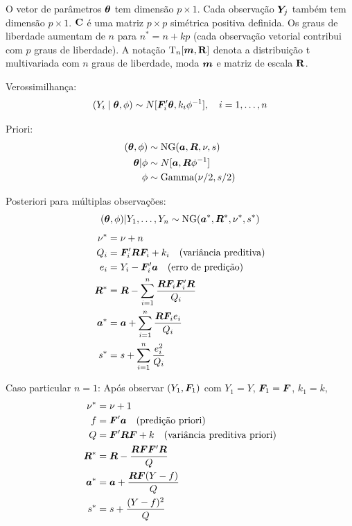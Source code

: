 \begin{theorem}
	\begin{note}
		\leavevmode
		\begin{outline}
			\1 O vetor de parâmetros $\bm{\theta}$ tem dimensão $p \times 1$.
			\1 Cada observação $\bm{Y}_j$ também tem dimensão $p \times 1$.
			\1 $\mathbf{C}$ é uma matriz $p \times p$ simétrica positiva definida.
			\1 Os graus de liberdade aumentam de $n$ para $n^* = n + kp$ (cada observação vetorial contribui com $p$ graus de liberdade).
			\1 A notação $\text{T}_n[\bm{m}, \mathbf{R}]$ denota a distribuição t multivariada com $n$ graus de liberdade, moda $\bm{m}$ e matriz de escala $\mathbf{R}$.
		\end{outline}
	\end{note}
\end{theorem}

\begin{theorem}
	\leavevmode 
	\begin{outline}
		\1 Verossimilhança: 
		\[ (Y_i \mid \bm{\theta}, \phi) \sim N[\bm{F}_i'\bm{\theta}, k_i\phi^{-1}], \quad i = 1, \ldots, n\]
		
		\1 Priori:
		\begin{align}
			(\bm{\theta},\phi) &\sim \text{NG}(\bm{a}, \bm{R}, \nu, s) \\
			\bm{\theta}|\phi &\sim N[\bm{a}, \bm{R}\phi^{-1}] \\
			\phi &\sim \text{Gamma}(\nu/2, s/2)
		\end{align}
		
		\1 Posteriori para múltiplas observações: 
		\[ (\bm{\theta},\phi)|Y_1, \ldots, Y_n \sim \text{NG}(\bm{a}^*, \bm{R}^*, \nu^*, s^*)\]
		\begin{align}
			\nu^* &= \nu + n \\
			Q_i &= \bm{F}_i'\bm{R}\bm{F}_i + k_i \quad \text{(variância preditiva)} \\
			e_i &= Y_i - \bm{F}_i'\bm{a} \quad \text{(erro de predição)} \\
			\bm{R}^* &= \bm{R} - \sum_{i=1}^n \frac{\bm{R}\bm{F}_i\bm{F}_i'\bm{R}}{Q_i} \\
			\bm{a}^* &= \bm{a} + \sum_{i=1}^n \frac{\bm{R}\bm{F}_i e_i}{Q_i} \\
			s^* &= s + \sum_{i=1}^n \frac{e_i^2}{Q_i}
		\end{align}	
		
		\2 Caso particular $n=1$: Após observar $(Y_1, \bm{F}_1)$ com $Y_1 = Y$, $\bm{F}_1 = \bm{F}$, $k_1 = k$,
		\begin{align}
			\nu^* &= \nu + 1 \\
			f &= \bm{F}'\bm{a} \quad \text{(predição priori)} \\
			Q &= \bm{F}'\bm{R}\bm{F} + k \quad \text{(variância preditiva priori)} \\
			\bm{R}^* &= \bm{R} - \frac{\bm{R}\bm{F}\bm{F}'\bm{R}}{Q} \\
			\bm{a}^* &= \bm{a} + \frac{\bm{R}\bm{F}(Y - f)}{Q} \\
			s^* &= s + \frac{(Y - f)^2}{Q}
		\end{align}
		

\end{outline}
\end{theorem}
